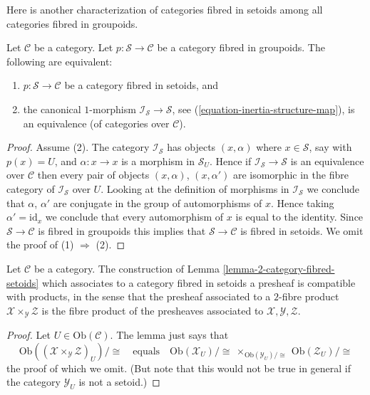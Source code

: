 \noindent
Here is another characterization of categories fibred in setoids
among all categories fibred in groupoids.

\begin{lemma}
\label{lemma-characterize-fibred-setoids-inertia}
Let $\mathcal{C}$ be a category.
Let $p : \mathcal{S} \to \mathcal{C}$ be a category fibred in groupoids.
The following are equivalent:
\begin{enumerate}
\item $p : \mathcal{S} \to \mathcal{C}$ be a category fibred in setoids, and
\item the canonical $1$-morphism $\mathcal{I}_\mathcal{S} \to \mathcal{S}$,
see (\ref{equation-inertia-structure-map}), is an equivalence (of categories
over $\mathcal{C}$).
\end{enumerate}
\end{lemma}

\begin{proof}
Assume (2). The category $\mathcal{I}_\mathcal{S}$ has objects
$(x, \alpha)$ where $x \in \mathcal{S}$, say with $p(x) = U$, and
$\alpha : x \to x$ is a morphism in $\mathcal{S}_U$. Hence if
$\mathcal{I}_\mathcal{S} \to \mathcal{S}$ is an equivalence over $\mathcal{C}$
then every pair of objects $(x, \alpha)$, $(x, \alpha')$ are isomorphic
in the fibre category of $\mathcal{I}_\mathcal{S}$ over $U$.
Looking at the definition of morphisms in $\mathcal{I}_\mathcal{S}$
we conclude that $\alpha$, $\alpha'$ are conjugate in the group
of automorphisms of $x$. Hence taking $\alpha' = \text{id}_x$ we conclude
that every automorphism of $x$ is equal to the identity.
Since $\mathcal{S} \to \mathcal{C}$ is fibred in groupoids this
implies that $\mathcal{S} \to \mathcal{C}$ is fibred in setoids.
We omit the proof of (1) $\Rightarrow$ (2).
\end{proof}

\begin{lemma}
\label{lemma-category-fibred-setoids-presheaves-products}
Let $\mathcal{C}$ be a category.
The construction of
Lemma \ref{lemma-2-category-fibred-setoids}
which associates to a category fibred in setoids a presheaf is
compatible with products, in the sense that the presheaf associated
to a $2$-fibre product $\mathcal{X} \times_{\mathcal{Y}} \mathcal{Z}$
is the fibre product of the presheaves associated to
$\mathcal{X}, \mathcal{Y}, \mathcal{Z}$.
\end{lemma}

\begin{proof}
Let $U \in \text{Ob}(\mathcal{C})$. The lemma just says that
$$
\text{Ob}((\mathcal{X} \times_{\mathcal{Y}} \mathcal{Z})_U)/\!\cong
\quad \text{equals} \quad
\text{Ob}(\mathcal{X}_U)/\!\cong
\ \times_{\text{Ob}(\mathcal{Y}_U)/\!\cong}
\ \text{Ob}(\mathcal{Z}_U)/\!\cong
$$
the proof of which we omit. (But note that this would not be true
in general if the category $\mathcal{Y}_U$ is not a setoid.)
\end{proof}










